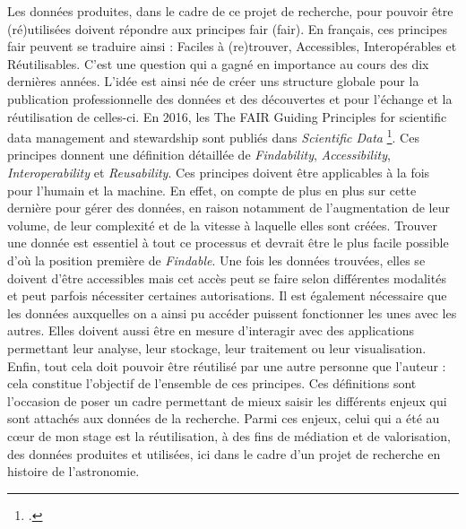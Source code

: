 Les données produites, dans le cadre de ce projet de recherche, pour pouvoir être (ré)utilisées doivent répondre aux principes \acrshort{fair} (\acrlong{fair}). En français, ces principes \acrshort{fair} peuvent se traduire ainsi : Faciles à (re)trouver, Accessibles, Interopérables et Réutilisables. C’est une question qui a gagné en importance au cours des dix dernières années. L’idée est ainsi née de créer uns structure globale pour la publication professionnelle des données et des découvertes et pour l’échange et la réutilisation de celles-ci. En 2016, les \og{}The FAIR Guiding Principles for scientific data management and stewardship\fg{} sont publiés dans \textit{Scientific Data} \footnote{\cite{aalbersbergFAIRGuidingPrinciples2016}.}. Ces principes donnent une définition détaillée de \textit{Findability}, \textit{Accessibility}, \textit{Interoperability} et \textit{Reusability}. Ces principes doivent être applicables à la fois pour l’humain et la machine. En effet, on compte de plus en plus sur cette dernière pour gérer des données, en raison notamment de l’augmentation de leur volume, de leur complexité et de la vitesse à laquelle elles sont créées. Trouver une donnée est essentiel à tout ce processus et devrait être le plus facile possible d’où la position première de \textit{Findable}. Une fois les données trouvées, elles se doivent d’être accessibles mais cet accès peut se faire selon différentes modalités et peut parfois nécessiter certaines autorisations. Il est également nécessaire que les données auxquelles on a ainsi pu accéder puissent fonctionner les unes avec les autres. Elles doivent aussi être en mesure d’interagir avec des applications permettant leur analyse, leur stockage, leur traitement ou leur visualisation. Enfin, tout cela doit pouvoir être réutilisé par une autre personne que l’auteur : cela constitue l’objectif de l’ensemble de ces principes. Ces définitions sont l’occasion de poser un cadre permettant de mieux saisir les différents enjeux qui sont attachés aux données de la recherche. Parmi ces enjeux, celui qui a été au cœur de mon stage est la réutilisation, à des fins de médiation et de valorisation, des données produites et utilisées, ici dans le cadre d'un projet de recherche en histoire de l'astronomie.\\

